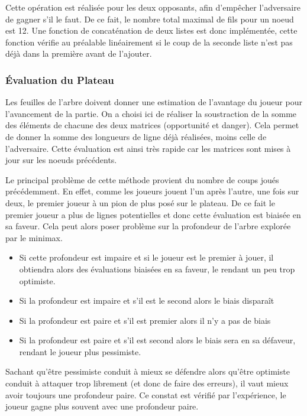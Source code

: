 \documentclass[a4paper,11pt]{article}
\begin{document}
Cette opération est réalisée pour les deux opposants, afin d'empêcher l'adversaire de gagner s'il le faut. De ce fait, le nombre total maximal de fils pour un noeud est 12. Une fonction de concaténation de deux listes est donc implémentée, cette fonction vérifie au préalable linéairement si le coup de la seconde liste n'est pas déjà dans la première avant de l'ajouter.

\subsubsection{Évaluation du Plateau}
\label{evalplateau}

Les feuilles de l'arbre doivent donner une estimation de l'avantage du joueur pour l'avancement de la partie. On a choisi ici de réaliser la soustraction de la somme des éléments de chacune des deux matrices (opportunité et danger). Cela permet de donner la somme des longueurs de ligne déjà réalisées, moins celle de l'adversaire. Cette évaluation est ainsi très rapide car les matrices sont mises à jour sur les noeuds précédents.

Le principal problème de cette méthode provient du nombre de coups joués précédemment. En effet, comme les joueurs jouent l'un après l'autre, une fois sur deux, le premier joueur à un pion de plus posé sur le plateau. De ce fait le premier joueur a plus de lignes potentielles et donc cette évaluation est biaisée en sa faveur. Cela peut alors poser problème sur la profondeur de l'arbre explorée par le minimax.


\begin{itemize}
    \item Si cette profondeur est impaire et si le joueur est le premier à jouer, il obtiendra alors des évaluations biaisées en sa faveur, le rendant un peu trop optimiste.
    \item Si la profondeur est impaire et s'il est le second alors le biais disparaît
    \item Si la profondeur est paire et s'il est premier alors il n'y a pas de biais
    \item Si la profondeur est paire et s'il est second alors le biais sera en sa défaveur, rendant le joueur plus pessimiste.
\end{itemize}

Sachant qu'être pessimiste conduit à mieux se défendre alors qu'être optimiste conduit à attaquer trop librement (et donc de faire des erreurs), il vaut mieux avoir toujours une profondeur paire. Ce constat est vérifié par l'expérience, le joueur gagne plus souvent avec une profondeur paire.
\end{document}
